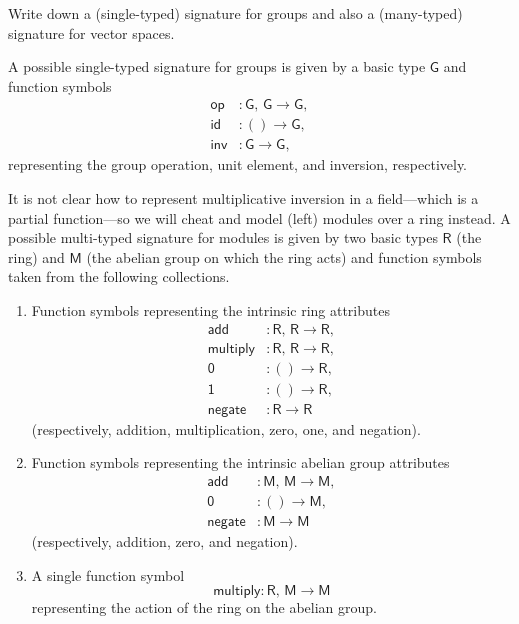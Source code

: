 \begin{exercise}
Write down a (single-typed) signature for groups and also a (many-typed) signature for vector spaces.
\end{exercise}

\begin{solution}
A possible single-typed signature for groups is given by a basic type \(\mathsf{G}\) and function symbols
\begin{align*}
\mathsf{op} &: \mathsf{G},\, \mathsf{G} \to \mathsf{G}, \\
\mathsf{id} &: () \to \mathsf{G}, \\
\mathsf{inv} &: \mathsf{G} \to \mathsf{G},
\end{align*}
representing the group operation, unit element, and inversion, respectively.
\end{solution}

\begin{solution}
It is not clear how to represent multiplicative inversion in a field---which is a partial function---so we will cheat and model (left) modules over a ring instead.
A possible multi-typed signature for modules is given by two basic types \(\mathsf{R}\) (the ring) and \(\mathsf{M}\) (the abelian group on which the ring acts) and function symbols taken from the following collections.
\begin{enumerate}
\item
Function symbols representing the intrinsic ring attributes
\begin{align*}
\mathsf{add} &: \mathsf{R},\, \mathsf{R} \to \mathsf{R}, \\
\mathsf{multiply} &: \mathsf{R},\, \mathsf{R} \to \mathsf{R}, \\
\mathsf{\mathsf{0}} &: () \to \mathsf{R}, \\
\mathsf{\mathsf{1}} &: () \to \mathsf{R}, \\
\mathsf{negate} &: \mathsf{R} \to \mathsf{R}
\end{align*}
(respectively, addition, multiplication, zero, one, and negation).
\item
Function symbols representing the intrinsic abelian group attributes
\begin{align*}
\mathsf{add} &: \mathsf{M},\, \mathsf{M} \to \mathsf{M}, \\
\mathsf{0} &: () \to \mathsf{M}, \\
\mathsf{negate} &: \mathsf{M} \to \mathsf{M}
\end{align*}
(respectively, addition, zero, and negation).
\item
A single function symbol
\begin{equation*}
\mathsf{multiply} : \mathsf{R},\,\mathsf{M} \to \mathsf{M}
\end{equation*}
representing the action of the ring on the abelian group.
\qedhere
\end{enumerate}
\end{solution}
